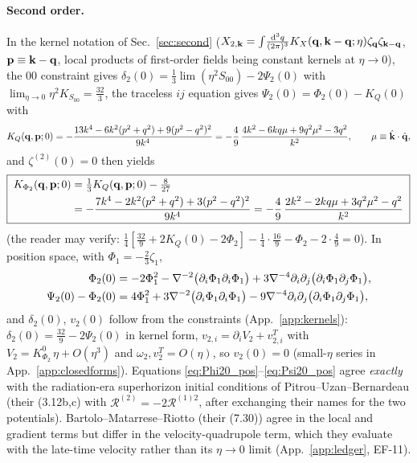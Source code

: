 \paragraph{Second order.}
In the kernel notation of Sec.~\ref{sec:second} ($X_{2,\mathbf k}=\int\!\frac{\mathrm d^3q}{(2\pi)^3}K_X(\mathbf q,\mathbf k-\mathbf q;\eta)\zeta_{\mathbf q}\zeta_{\mathbf k-\mathbf q}$,
$\mathbf p\equiv\mathbf k-\mathbf q$, local products of first-order fields being constant kernels at $\eta\to0$), the 00 constraint
gives $\delta_2(0)=\tfrac13\lim(\eta^2S_{00})-2\Psi_2(0)$ with $\lim_{\eta\to0}\eta^2K_{S_{00}}=\tfrac{32}3$, the
traceless $ij$ equation gives $\Psi_2(0)=\Phi_2(0)-K_{Q}(0)$ with
\begin{equation}
K_Q(\mathbf q,\mathbf p;0)=-\frac{13k^4-6k^2(p^2+q^2)+9(p^2-q^2)^2}{9k^4}
=-\frac49\,\frac{4k^2-6kq\mu+9q^2\mu^2-3q^2}{k^2},\qquad \mu\equiv\hat{\mathbf k}\cdot\hat{\mathbf q},
\label{eq:KQ0}
\end{equation}
and $\zeta^{(2)}(0)=0$ then yields
\begin{equation}
\boxed{\;\begin{aligned}K_{\Phi_2}(\mathbf q,\mathbf p;0)&=\tfrac13K_Q(\mathbf q,\mathbf p;0)-\tfrac8{27}\\
&=-\frac{7k^4-2k^2(p^2+q^2)+3(p^2-q^2)^2}{9k^4}
=-\frac49\,\frac{2k^2-2kq\mu+3q^2\mu^2-q^2}{k^2}\end{aligned}\;}
\label{eq:KPhi20}
\end{equation}
(the reader may verify:
$\tfrac14[\tfrac{32}9+2K_Q(0)-2\Phi_2]-\tfrac14\cdot\tfrac{16}9-\Phi_2-2\cdot\tfrac49=0$).
In position space, with $\Phi_1=-\tfrac23\zeta_1$,
\begin{align}
\Phi_2(0)&=-2\Phi_1^2-\nabla^{-2}\big(\partial_i\Phi_1\partial_i\Phi_1\big)+3\nabla^{-4}\partial_i\partial_j\big(\partial_i\Phi_1\partial_j\Phi_1\big),\label{eq:Phi20_pos}\\
\Psi_2(0)-\Phi_2(0)&=4\Phi_1^2+3\nabla^{-2}\big(\partial_i\Phi_1\partial_i\Phi_1\big)-9\nabla^{-4}\partial_i\partial_j\big(\partial_i\Phi_1\partial_j\Phi_1\big),\label{eq:Psi20_pos}
\end{align}
and $\delta_2(0)$, $v_2(0)$ follow from the constraints (App.~\ref{app:kernels}): $\delta_2(0)=\tfrac{32}9-2\Psi_2(0)$ in kernel form,
$v_{2,i}=\partial_iV_2+v^T_{2,i}$ with $V_2=K^0_{\Phi_2}\,\eta+O(\eta^3)$ and $\omega_2,v^T_2=O(\eta)$, so $v_2(0)=0$ (small-$\eta$
series in App.~\ref{app:closedforms}).  Equations
\eqref{eq:Phi20_pos}--\eqref{eq:Psi20_pos} agree \emph{exactly} with the radiation-era superhorizon initial
conditions of Pitrou--Uzan--Bernardeau \cite{PUB} (their (3.12b,c) with $\mathcal R^{(2)}=-2\mathcal R^{(1)2}$,
after exchanging their names for the two potentials).  Bartolo--Matarrese--Riotto \cite{BMR2} (their (7.30))
agree in the local and gradient terms but differ in the velocity-quadrupole term, which they evaluate with
the late-time velocity rather than its $\eta\to0$ limit (App.~\ref{app:ledger}, EF-11).

